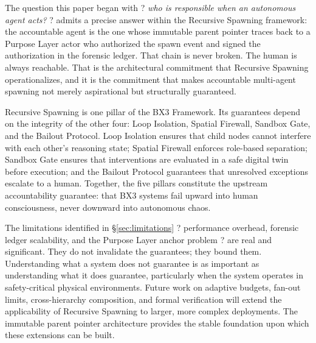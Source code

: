 \documentclass[12pt]{article}
\begin{document}
The question this paper began with ? \textit{who is responsible when an autonomous agent acts?} ? admits a precise answer within the Recursive Spawning framework: the accountable agent is the one whose immutable parent pointer traces back to a Purpose Layer actor who authorized the spawn event and signed the authorization in the forensic ledger. That chain is never broken. The human is always reachable. That is the architectural commitment that Recursive Spawning operationalizes, and it is the commitment that makes accountable multi-agent spawning not merely aspirational but structurally guaranteed.

Recursive Spawning is one pillar of the BX3 Framework. Its guarantees depend on the integrity of the other four: Loop Isolation, Spatial Firewall, Sandbox Gate, and the Bailout Protocol. Loop Isolation ensures that child nodes cannot interfere with each other's reasoning state; Spatial Firewall enforces role-based separation; Sandbox Gate ensures that interventions are evaluated in a safe digital twin before execution; and the Bailout Protocol guarantees that unresolved exceptions escalate to a human. Together, the five pillars constitute the upstream accountability guarantee: that BX3 systems fail upward into human consciousness, never downward into autonomous chaos.

The limitations identified in \S\ref{sec:limitations} ? performance overhead, forensic ledger scalability, and the Purpose Layer anchor problem ? are real and significant. They do not invalidate the guarantees; they bound them. Understanding what a system does not guarantee is as important as understanding what it does guarantee, particularly when the system operates in safety-critical physical environments. Future work on adaptive budgets, fan-out limits, cross-hierarchy composition, and formal verification will extend the applicability of Recursive Spawning to larger, more complex deployments. The immutable parent pointer architecture provides the stable foundation upon which these extensions can be built.
\end{document}
